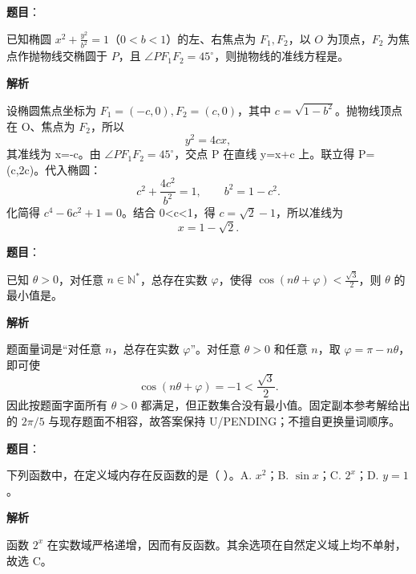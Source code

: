 \begin{answer}

\textbf{题目}：

已知椭圆 $x^2+\frac{y^2}{b^2}=1$（$0<b<1$）的左、右焦点为 $F_1,F_2$，以 $O$ 为顶点，$F_2$ 为焦点作抛物线交椭圆于 $P$，且 $\angle PF_1F_2=45^\circ$，则抛物线的准线方程是\gkblank{}。

\textbf{解析}

设椭圆焦点坐标为 \(F_1=(-c,0),F_2=(c,0)\)，其中 \(c=\sqrt{1-b^2}\)。抛物线顶点在 O、焦点为 \(F_2\)，所以
\nopagebreak[4]
\[
y^2=4cx,
\]
其准线为 x=-c。由 \(\angle PF_1F_2=45^\circ\)，交点 P 在直线 y=x+c 上。联立得 P=(c,2c)。代入椭圆：
\nopagebreak[4]
\[
c^2+\frac{4c^2}{b^2}=1,\qquad b^2=1-c^2.
\]
化简得 \(c^4-6c^2+1=0\)。结合 0<c<1，得 \(c=\sqrt2-1\)，所以准线为
\nopagebreak[4]
\[
x=1-\sqrt2.
\]


\end{answer}
\begin{answer}

\textbf{题目}：

已知 $\theta>0$，对任意 $n\in\mathbb N^*$，总存在实数 $\varphi$，使得 $\cos(n\theta+\varphi)<\frac{\sqrt3}{2}$，则 $\theta$ 的最小值是\gkblank{}。

\textbf{解析}

题面量词是“对任意 $n$，总存在实数 $\varphi$”。对任意 $\theta>0$ 和任意 $n$，取 \(\varphi=\pi-n\theta\)，即可使
\nopagebreak[4]
\[
\cos(n\theta+\varphi)=-1<\frac{\sqrt3}{2}.
\]
因此按题面字面所有 $\theta>0$ 都满足，但正数集合没有最小值。固定副本参考解给出的 $2\pi/5$ 与现存题面不相容，故答案保持 U/PENDING；不擅自更换量词顺序。


\end{answer}
\begin{answer}

\textbf{题目}：

下列函数中，在定义域内存在反函数的是（ ）。A. $x^2$；B. $\sin x$；C. $2^x$；D. $y=1$。

\textbf{解析}

函数 \(2^x\) 在实数域严格递增，因而有反函数。其余选项在自然定义域上均不单射，故选 C。


\end{answer}
